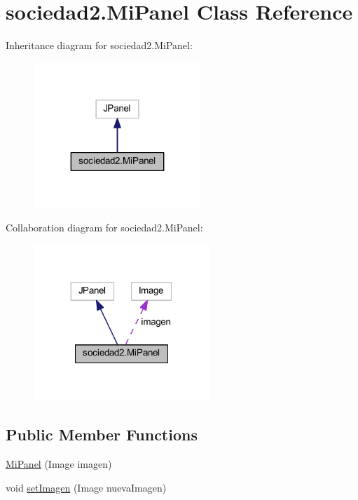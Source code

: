 \hypertarget{classsociedad2_1_1_mi_panel}{}\section{sociedad2.\+Mi\+Panel Class Reference}
\label{classsociedad2_1_1_mi_panel}


Inheritance diagram for sociedad2.\+Mi\+Panel\+:\nopagebreak
\begin{figure}[H]
\begin{center}
\leavevmode
\includegraphics[width=179pt]{classsociedad2_1_1_mi_panel__inherit__graph}
\end{center}
\end{figure}


Collaboration diagram for sociedad2.\+Mi\+Panel\+:\nopagebreak
\begin{figure}[H]
\begin{center}
\leavevmode
\includegraphics[width=188pt]{classsociedad2_1_1_mi_panel__coll__graph}
\end{center}
\end{figure}
\subsection*{Public Member Functions}
\begin{DoxyCompactItemize}
\item 
\mbox{\hyperlink{classsociedad2_1_1_mi_panel_a728fc4503e18ffec92d5391ef75f7f40}{Mi\+Panel}} (Image imagen)
\item 
void \mbox{\hyperlink{classsociedad2_1_1_mi_panel_a94a0438f3a9cdbb34b254eed58037304}{set\+Imagen}} (Image nueva\+Imagen)
\end{DoxyCompactItemize}
